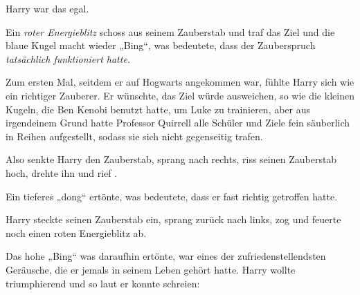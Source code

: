 Harry war das egal.


Ein \emph{roter Energieblitz} schoss aus seinem Zauberstab und traf das Ziel und die blaue Kugel macht wieder „Bing“, was bedeutete, dass der Zauberspruch \emph{tatsächlich funktioniert hatte.}

Zum ersten Mal, seitdem er auf Hogwarts angekommen war, fühlte Harry sich wie ein richtiger Zauberer. Er wünschte, das Ziel würde ausweichen, so wie die kleinen Kugeln, die Ben Kenobi benutzt hatte, um Luke zu trainieren, aber aus irgendeinem Grund hatte Professor Quirrell alle Schüler und Ziele fein säuberlich in Reihen aufgestellt, sodass sie sich nicht gegenseitig trafen.

Also senkte Harry den Zauberstab, sprang nach rechts, riss seinen Zauberstab hoch, drehte ihn und rief .

Ein tieferes „dong“ ertönte, was bedeutete, dass er fast richtig getroffen hatte.

Harry steckte seinen Zauberstab ein, sprang zurück nach links, zog und feuerte noch einen roten Energieblitz ab.

Das hohe „Bing“ was daraufhin ertönte, war eines der zufriedenstellendsten Geräusche, die er jemals in seinem Leben gehört hatte. Harry wollte triumphierend und so laut er konnte schreien: \emph{}

